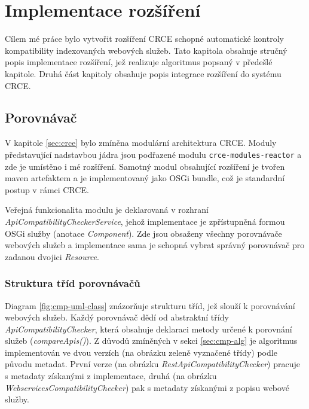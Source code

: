 \documentclass[czech,DP]{thesiskiv}
\begin{document}
\chapter{Implementace rozšíření}

Cílem mé práce bylo vytvořit rozšíření CRCE schopné automatické kontroly kompatibility indexovaných webových služeb. Tato kapitola obsahuje stručný popis implementace rozšíření, jež realizuje algoritmus popsaný v předešlé kapitole. Druhá část kapitoly obsahuje popis integrace rozšíření do systému CRCE.

\section{Porovnávač}

V kapitole \ref{sec:crce} bylo zmíněna modulární architektura CRCE. Moduly představující nadstavbou jádra jsou podřazené modulu \verb|crce-modules-reactor| a zde je umístěno i mé rozšíření. Samotný modul obsahující rozšíření je tvořen maven artefaktem a je implementovaný jako OSGi bundle, což je standardní postup v rámci CRCE.

Veřejná funkcionalita modulu je deklarovaná v rozhraní \textit{ApiCompatibilityCheckerService}, jehož implementace je zpřístupněná formou OSGi služby (anotace \textit{Component}). Zde jsou obsaženy všechny porovnávače webových služeb a implementace sama je schopná vybrat správný porovnávač pro zadanou dvojici \textit{Resource}.

\subsection{Struktura tříd porovnávačů}

Diagram \ref{fig:cmp-uml-class} znázorňuje strukturu tříd, jež slouží k porovnávání webových služeb. Každý porovnávač dědí od abstraktní třídy \textit{ApiCompatibilityChecker}, která obsahuje deklaraci metody určené k porovnání služeb (\textit{compareApis()}). Z důvodů zmíněných v sekci \ref{sec:cmp-alg} je algoritmus implementován ve dvou verzích (na obrázku zeleně vyznačené třídy) podle původu metadat. První verze (na obrázku \textit{RestApiCompatibilityChecker}) pracuje s metadaty získanými z implementace, druhá (na obrázku \textit{WebservicesCompatibilityChecker}) pak s metadaty získanými z popisu webové služby.

\end{document}
